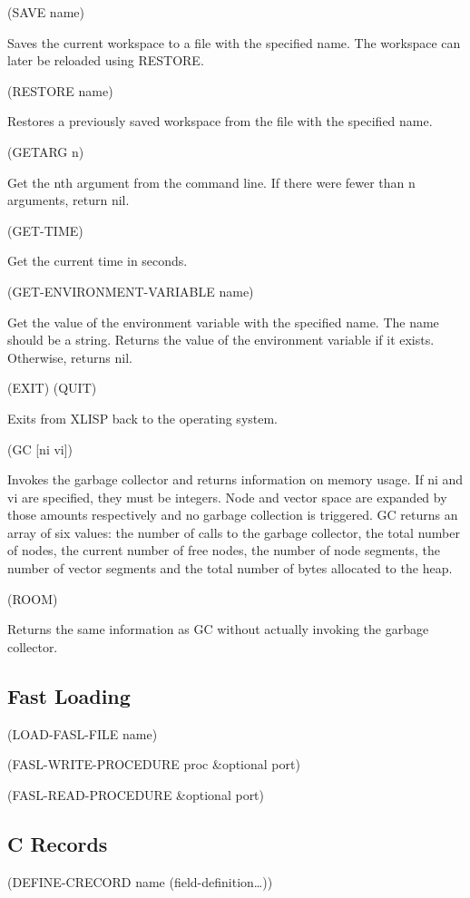 \documentclass[11pt]{article}
\begin{document}
(SAVE name)

Saves the current workspace to a file with the specified name.  The
workspace can later be reloaded using RESTORE.

(RESTORE name)

Restores a previously saved workspace from the file with the specified
name.

(GETARG n)

Get the nth argument from the command line.  If there were fewer than n
arguments, return nil.

(GET-TIME)

Get the current time in seconds.

(GET-ENVIRONMENT-VARIABLE name)

Get the value of the environment variable with the specified name.  The
name should be a string.  Returns the value of the environment variable
if it exists.  Otherwise, returns nil.

(EXIT)
(QUIT)

Exits from XLISP back to the operating system.

(GC [ni vi])

Invokes the garbage collector and returns information on memory
usage. If ni and vi are specified, they must be integers. Node and
vector space are expanded by those amounts respectively and no garbage
collection is triggered. GC returns an array of six values: the number
of calls to the garbage collector, the total number of nodes, the
current number of free nodes, the number of node segments, the number of
vector segments and the total number of bytes allocated to the heap.

(ROOM)

Returns the same information as GC without actually invoking the garbage
collector.
\subsection{Fast Loading}
\label{sec-1-44}

(LOAD-FASL-FILE name)

(FASL-WRITE-PROCEDURE proc \&optional port)

(FASL-READ-PROCEDURE \&optional port)
\subsection{C Records}
\label{sec-1-45}

(DEFINE-CRECORD name (field-definition\ldots{}))
\end{document}
